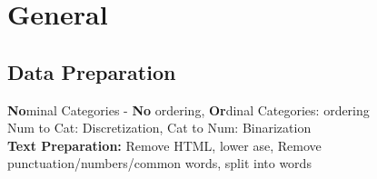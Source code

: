 \section{General}
\begin{mdframed}[style=eqbox]
\subsection{Data Preparation}
\textbf{No}minal Categories - \textbf{No} ordering, \textbf{Or}dinal Categories: ordering\\
Num to Cat: Discretization, Cat to Num: Binarization\\
\textbf{Text Preparation:} Remove HTML, lower ase, Remove punctuation/numbers/common words, split into words
\end{mdframed}